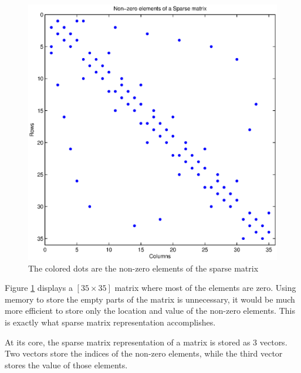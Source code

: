 \documentclass[authoryearcitations]{UoYCSproject}
\begin{document}
\begin{figure}
\centering
\includegraphics[scale=0.5]{figures/sparseVisual.eps}
\caption{The colored dots are the non-zero elements of the sparse matrix}
\label{sparseExample}
\end{figure}

Figure \ref{sparseExample} displays a $[35 \times 35]$ matrix where most of the elements are zero. Using memory
to store the empty parts of the matrix is unnecessary, it would be much more efficient to store only the location 
and value of the non-zero elements. This is exactly what sparse matrix representation accomplishes. 

At its core, the sparse matrix representation of a matrix is stored as 3 vectors. Two vectors store the 
indices of the non-zero elements, while the third vector stores the value of those elements. 
\end{document}
